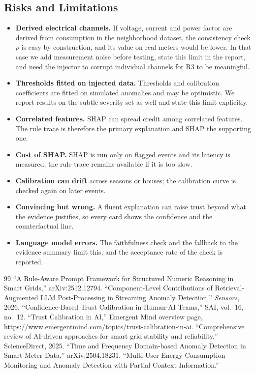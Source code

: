 \documentclass[11pt,a4paper]{article}
\begin{document}
\subsection{Risks and Limitations}
\label{sec:risks}
\begin{itemize}[leftmargin=*,itemsep=2pt]
  \item \textbf{Derived electrical channels.} If voltage, current and power factor are
        derived from consumption in the neighborhood dataset, the consistency check $\rho$ is easy by
        construction, and its value on real meters would be lower. In that case we add measurement noise
        before testing, state this limit in the report, and need the injector to corrupt individual channels
        for R3 to be meaningful.
  \item \textbf{Thresholds fitted on injected data.} Thresholds and calibration coefficients are fitted on
        simulated anomalies and may be optimistic. We report results on the subtle severity set as well and
        state this limit explicitly.
  \item \textbf{Correlated features.} SHAP can spread credit among correlated features. The rule trace is
        therefore the primary explanation and SHAP the supporting one.
  \item \textbf{Cost of SHAP.} SHAP is run only on flagged events and its latency is measured; the rule
        trace remains available if it is too slow.
  \item \textbf{Calibration can drift} across seasons or houses; the calibration curve is checked again on
        later events.
  \item \textbf{Convincing but wrong.} A fluent explanation can raise trust beyond what the evidence
        justifies, so every card shows the confidence and the counterfactual line.
  \item \textbf{Language model errors.} The faithfulness check and the fallback to the evidence summary
        limit this, and the acceptance rate of the check is reported.
\end{itemize}


\begin{thebibliography}{99}
 ``A Rule-Aware Prompt Framework for Structured Numeric Reasoning in Smart Grids,'' arXiv:2512.12794.
 ``Component-Level Contributions of Retrieval-Augmented LLM Post-Processing in Streaming Anomaly Detection,'' \emph{Sensors}, 2026.
 ``Confidence-Based Trust Calibration in Human-AI Teams,'' SAI, vol.~16, no.~12.
 ``Trust Calibration in AI,'' Emergent Mind overview page, \url{https://www.emergentmind.com/topics/trust-calibration-in-ai}.
 ``Comprehensive review of AI-driven approaches for smart grid stability and reliability,'' ScienceDirect, 2025.
 ``Time and Frequency Domain-based Anomaly Detection in Smart Meter Data,'' arXiv:2504.18231.
 ``Multi-User Energy Consumption Monitoring and Anomaly Detection with Partial Context Information.''
\end{thebibliography}
\end{document}
